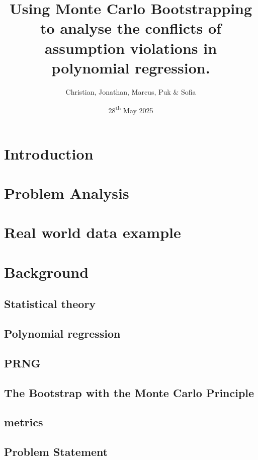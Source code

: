 \documentclass{article}
\title{Using Monte Carlo Bootstrapping to analyse the conflicts of assumption violations in polynomial regression.\\}
\author{Christian, Jonathan, Marcus, Puk \& Sofia }
\date{28\textsuperscript{th} May 2025}
\begin{document}
	
	
	\setcounter{section}{0}
	
	
	\newpage
	\tableofcontents
	\newpage
	
	\section{Introduction}
	
	\newpage
	
	\section{Problem Analysis}
	
	\newpage
	
	\section{Real world data example}
	
	\newpage
	\section{Background}
	
	\subsection{Statistical theory}
	
	\newpage
	\subsection{Polynomial regression}
	
	\newpage
	\subsection{PRNG}
	
	\newpage
	\subsection{The Bootstrap with the Monte Carlo Principle}
	
	\newpage
	\subsection{metrics}
	
	\newpage
	\subsection{Problem Statement}
	
	\newpage
	
\end{document}
